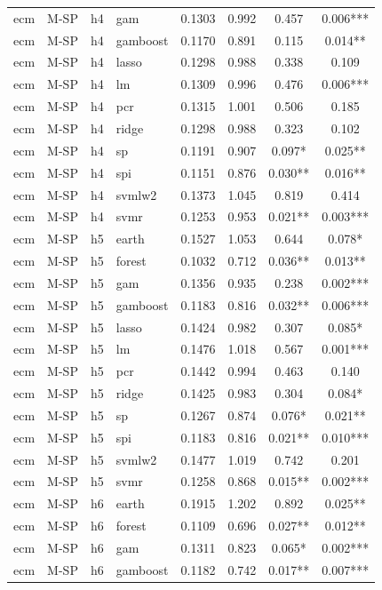 \begin{ThreePartTable}
\begin{longtable}[t]{llclcccc}
ecm & M-SP & h4 & gam & 0.1303 & 0.992 & 0.457 & 0.006***\\
ecm & M-SP & h4 & gamboost & 0.1170 & 0.891 & 0.115 & 0.014**\\
ecm & M-SP & h4 & lasso & 0.1298 & 0.988 & 0.338 & 0.109\\
ecm & M-SP & h4 & lm & 0.1309 & 0.996 & 0.476 & 0.006***\\
ecm & M-SP & h4 & pcr & 0.1315 & 1.001 & 0.506 & 0.185\\
ecm & M-SP & h4 & ridge & 0.1298 & 0.988 & 0.323 & 0.102\\
ecm & M-SP & h4 & sp & 0.1191 & 0.907 & 0.097* & 0.025**\\
ecm & M-SP & h4 & spi & 0.1151 & 0.876 & 0.030** & 0.016**\\
ecm & M-SP & h4 & svmlw2 & 0.1373 & 1.045 & 0.819 & 0.414\\
ecm & M-SP & h4 & svmr & 0.1253 & 0.953 & 0.021** & 0.003***\\
\addlinespace
ecm & M-SP & h5 & earth & 0.1527 & 1.053 & 0.644 & 0.078*\\
ecm & M-SP & h5 & forest & 0.1032 & 0.712 & 0.036** & 0.013**\\
ecm & M-SP & h5 & gam & 0.1356 & 0.935 & 0.238 & 0.002***\\
ecm & M-SP & h5 & gamboost & 0.1183 & 0.816 & 0.032** & 0.006***\\
ecm & M-SP & h5 & lasso & 0.1424 & 0.982 & 0.307 & 0.085*\\
ecm & M-SP & h5 & lm & 0.1476 & 1.018 & 0.567 & 0.001***\\
ecm & M-SP & h5 & pcr & 0.1442 & 0.994 & 0.463 & 0.140\\
ecm & M-SP & h5 & ridge & 0.1425 & 0.983 & 0.304 & 0.084*\\
ecm & M-SP & h5 & sp & 0.1267 & 0.874 & 0.076* & 0.021**\\
ecm & M-SP & h5 & spi & 0.1183 & 0.816 & 0.021** & 0.010***\\
ecm & M-SP & h5 & svmlw2 & 0.1477 & 1.019 & 0.742 & 0.201\\
ecm & M-SP & h5 & svmr & 0.1258 & 0.868 & 0.015** & 0.002***\\
\addlinespace
ecm & M-SP & h6 & earth & 0.1915 & 1.202 & 0.892 & 0.025**\\
ecm & M-SP & h6 & forest & 0.1109 & 0.696 & 0.027** & 0.012**\\
ecm & M-SP & h6 & gam & 0.1311 & 0.823 & 0.065* & 0.002***\\
ecm & M-SP & h6 & gamboost & 0.1182 & 0.742 & 0.017** & 0.007***\\

\end{longtable}
\end{ThreePartTable}
